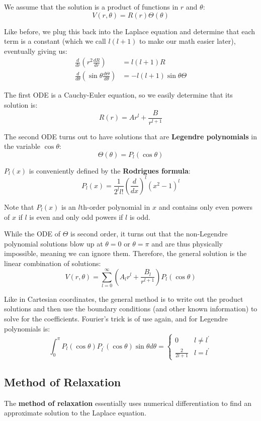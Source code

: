 \documentclass{article}
\begin{document}
We assume that the solution is a product of functions in \(r\) and \(\theta \):
\[
    V(r, \theta )=R(r)\Theta(\theta )
\]

Like before, we plug this back into the Laplace equation and determine that each term is a constant (which we call \(l(l+1)\) to make our math easier later), eventually giving us:
\begin{align*}
    \frac{d}{dr}(r^2 \frac{dR}{dr})&=l(l+1)R \\
    \frac{d}{d \theta }(\sin \theta \frac{d \Theta }{d \theta })&=-l(l+1)\sin \theta \Theta 
\end{align*}

The first ODE is a Cauchy-Euler equation, so we easily determine that its solution is:
\[
    R(r)=Ar^l+\frac{B}{r^{l+1}}
\]

The second ODE turns out to have solutions that are \textbf{Legendre polynomials} in the variable \(\cos \theta \):
\[
    \Theta(\theta )=P_l(\cos \theta )
\] 

\(P_l(x)\) is conveniently defined by the \textbf{Rodrigues formula}:
\[
    P_l(x)=\frac{1}{2^l l!}(\frac{d}{dx})^l (x^2-1)^l
\]  

Note that \(P_l(x)\) is an \(l\)th-order polynomial in \(x\) and contains only even powers of \(x\) if \(l\) is even and only odd powers if \(l\) is odd.

While the ODE of \(\Theta \) is second order, it turns out that the non-Legendre polynomial solutions blow up at \(\theta =0\) or \(\theta =\pi \) and are thus 
physically impossible, meaning we can ignore them. Therefore, the general solution is the linear combination of solutions:
\[
    V(r,\theta )=\sum_{l=0}^{\infty }(A_l r^l+\frac{B_l}{r^{l+1}})P_l(\cos \theta )
\] 

Like in Cartesian coordinates, the general method is to write out the product solutions and then use the boundary conditions (and other known information) to solve 
for the coefficients. Fourier's trick is of use again, and for Legendre polynomials is:
\[
    \int_{0}^{\pi }P_l(\cos \theta )P_{l^{\prime} }(\cos \theta )\sin \theta d \theta =\begin{cases} 0 & l\neq l^{\prime} \\  \frac{2}{2l+1} & l=l^{\prime} \end{cases}
\]

\subsection{Method of Relaxation}
The \textbf{method of relaxation} essentially uses numerical differentiation to find an approximate solution to the Laplace equation.
\end{document}
